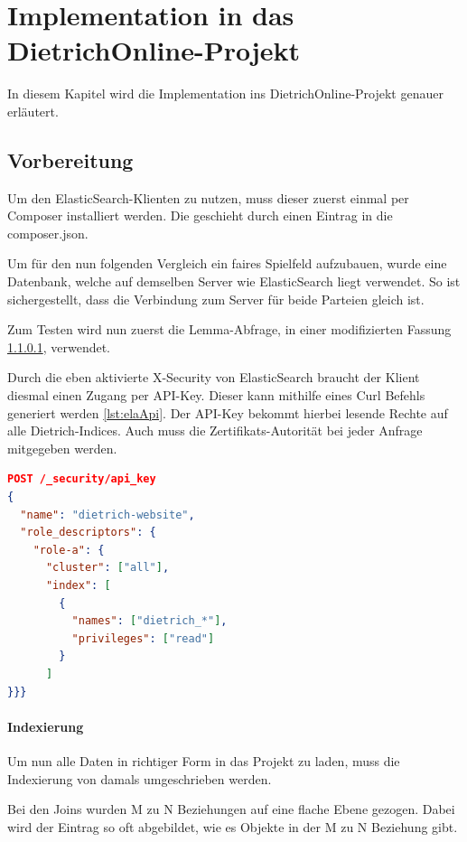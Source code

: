 \chapter{Implementation in das DietrichOnline-Projekt}

In diesem Kapitel wird die Implementation ins DietrichOnline-Projekt genauer erläutert.

\section{Vorbereitung}

Um den ElasticSearch-Klienten zu nutzen, muss dieser zuerst einmal per Composer installiert werden. Die geschieht durch einen Eintrag in die composer.json.

Um für den nun folgenden Vergleich ein faires Spielfeld aufzubauen, wurde eine Datenbank, welche auf demselben Server wie ElasticSearch liegt verwendet. So ist sichergestellt, dass die Verbindung zum Server für beide Parteien gleich ist.

Zum Testen wird nun zuerst die Lemma-Abfrage, in einer modifizierten Fassung \ref{lemmaIndexierungEla}, verwendet.

Durch die eben aktivierte X-Security von ElasticSearch braucht der Klient diesmal einen Zugang per API-Key. Dieser kann mithilfe eines Curl Befehls generiert werden \ref{lst:elaApi}. Der API-Key bekommt hierbei lesende Rechte auf alle Dietrich-Indices. Auch muss die Zertifikats-Autorität bei jeder Anfrage mitgegeben werden. 

\begin{lstlisting}[language=JSON, frame=single, label={lst:elaApi}] 
POST /_security/api_key
{
  "name": "dietrich-website",
  "role_descriptors": { 
    "role-a": {
      "cluster": ["all"],
      "index": [
        {
          "names": ["dietrich_*"],
          "privileges": ["read"]
        }
      ]
}}}
\end{lstlisting}


\subsubsection{Indexierung}
\label{lemmaIndexierungEla}

Um nun alle Daten in richtiger Form in das Projekt zu laden, muss die Indexierung von damals umgeschrieben werden. 

Bei den Joins wurden M zu N Beziehungen auf eine flache Ebene gezogen. Dabei wird der Eintrag so oft abgebildet, wie es Objekte in der M zu N Beziehung gibt. 

